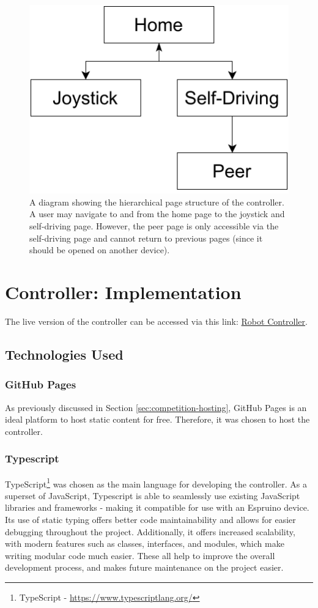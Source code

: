 \documentclass{l4proj}
\begin{document}
\begin{figure}[!ht]
    \centering
    \includegraphics[width=0.45\linewidth]{images/page-structure.pdf}
    \caption{A diagram showing the hierarchical page structure of the controller. A user may navigate to and from the home page to the joystick and self-driving page. However, the peer page is only accessible via the self-driving page and cannot return to previous pages (since it should be opened on another device).}
    \label{fig:page-structure}
\end{figure}


\chapter{Controller: Implementation}
The live version of the controller can be accessed via this link: \href{https://lewistrundle.github.io/L4-Individual-Project/index.html}{Robot Controller}.

\section{Technologies Used}
\subsection{GitHub Pages}
As previously discussed in Section \ref{sec:competition-hosting}, GitHub Pages is an ideal platform to host static content for free. Therefore, it was chosen to host the controller.

\subsection{Typescript}
TypeScript\footnote{TypeScript - \url{https://www.typescriptlang.org/}} was chosen as the main language for developing the controller. As a superset of JavaScript, Typescript is able to seamlessly use existing JavaScript libraries and frameworks - making it compatible for use with an Espruino device. Its use of static typing offers better code maintainability and allows for easier debugging throughout the project. Additionally, it offers increased scalability, with modern features such as classes, interfaces, and modules, which make writing modular code much easier. These all help to improve the overall development process, and makes future maintenance on the project easier.
\end{document}

